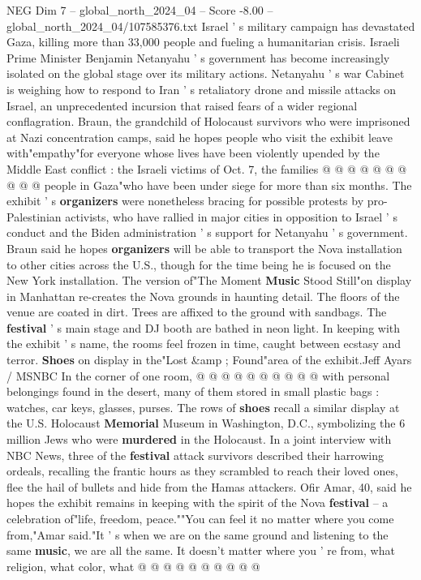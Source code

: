 \begin{textsample}{NEG Dim 7 – global\_north\_2024\_04 – Score -8.00 – global\_north\_2024\_04/107585376.txt}
Israel ' s military campaign has devastated Gaza, killing more than 33,000 people and fueling a humanitarian crisis.
Israeli Prime Minister Benjamin Netanyahu ' s government has become increasingly isolated on the global stage over its military actions.
Netanyahu ' s war Cabinet is weighing how to respond to Iran ' s retaliatory drone and missile attacks on Israel, an unprecedented incursion that raised fears of a wider regional conflagration.
Braun, the grandchild of Holocaust survivors who were imprisoned at Nazi concentration camps, said he hopes people who visit the exhibit leave with"empathy"for everyone whose lives have been violently upended by the Middle East conflict : the Israeli victims of Oct. 7, the families @ @ @ @ @ @ @ @ @ @ people in Gaza"who have been under siege for more than six months.
The exhibit ' s \textbf{organizers} were nonetheless bracing for possible protests by pro-Palestinian activists, who have rallied in major cities in opposition to Israel ' s conduct and the Biden administration ' s support for Netanyahu ' s government.
Braun said he hopes \textbf{organizers} will be able to transport the Nova installation to other cities across the U.S., though for the time being he is focused on the New York installation.
The version of"The Moment \textbf{Music} Stood Still"on display in Manhattan re-creates the Nova grounds in haunting detail.
The floors of the venue are coated in dirt.
Trees are affixed to the ground with sandbags.
The \textbf{festival} ' s main stage and DJ booth are bathed in neon light.
In keeping with the exhibit ' s name, the rooms feel frozen in time, caught between ecstasy and terror. \textbf{Shoes} on display in the"Lost \&amp ; Found"area of the exhibit.Jeff Ayars / MSNBC In the corner of one room, @ @ @ @ @ @ @ @ @ @ with personal belongings found in the desert, many of them stored in small plastic bags : watches, car keys, glasses, purses.
The rows of \textbf{shoes} recall a similar display at the U.S.
Holocaust \textbf{Memorial} Museum in Washington, D.C., symbolizing the 6 million Jews who were \textbf{murdered} in the Holocaust.
In a joint interview with NBC News, three of the \textbf{festival} attack survivors described their harrowing ordeals, recalling the frantic hours as they scrambled to reach their loved ones, flee the hail of bullets and hide from the Hamas attackers.
Ofir Amar, 40, said he hopes the exhibit remains in keeping with the spirit of the Nova \textbf{festival} -- a celebration of"life, freedom, peace.""You can feel it no matter where you come from,"Amar said."It ' s when we are on the same ground and listening to the same \textbf{music}, we are all the same.
It doesn't matter where you ' re from, what religion, what color, what @ @ @ @ @ @ @ @ @ @

\end{textsample}
